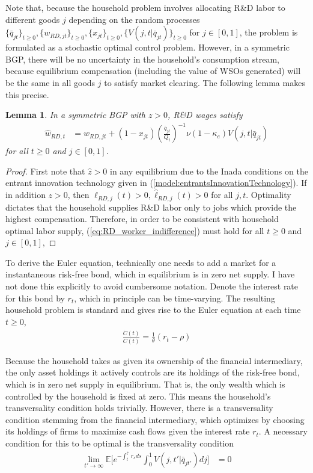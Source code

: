 \documentclass[11pt,english]{article}
\newtheorem{lemma}{Lemma}
\begin{document}
Note that, because the household problem involves allocating R\&D labor to different goods $j$ depending on the random processes $\{\bar{q}_{jt}\}_{t \ge 0}, \{w_{RD,jt}\}_{t\ge 0}, \{x_{jt}\}_{t\ge 0}, \{V(j,t|\bar{q}_{jt})\}_{t\ge 0}$ for $j \in [0,1]$, the problem is formulated as a stochastic optimal control problem. However, in a symmetric BGP, there will be no uncertainty in the household's consumption stream, because equilibrium compensation (including the value of WSOs generated) will be the same in all goods $j$ to satisfy market clearing. The following lemma makes this precise.

\begin{lemma}\label{lemma:RD_worker_indifference}
	In a symmetric BGP with $z > 0$, R\&D wages satisfy
	\begin{align}
	\hat{w}_{RD,t} &= w_{RD,jt} + (1-x_{jt}) (\frac{\bar{q}_{jt}}{Q_t})^{-1} \nu (1-\kappa_e) V(j,t|\bar{q}_{jt}) \label{eq:RD_worker_indifference}
	\end{align}
	for all $t \ge 0$ and $j \in [0,1]$.
\end{lemma}

\begin{proof}
	First note that $\hat{z} > 0$ in any equilibrium due to the Inada conditions on the entrant innovation technology given in  (\ref{model:entrantsInnovationTechnology}). If in addition $z > 0$, then $\ell_{RD,j}(t) > 0, \hat{\ell}_{RD,j}(t) > 0$ for all $j,t$. Optimality dictates that the household supplies R\&D labor only to jobs which provide the highest compensation. Therefore, in order to be consistent with household optimal labor supply, (\ref{eq:RD_worker_indifference}) must hold for all $t \ge 0$ and $j \in [0,1]$, 
\end{proof}

To derive the Euler equation, technically one needs to add a market for a instantaneous risk-free bond, which in equilibrium is in zero net supply. I have not done this explicitly to avoid cumbersome notation. Denote the interest rate for this bond by $r_t$, which in principle can be time-varying. The resulting household problem is standard and gives rise to the Euler equation at each time $t \ge 0$, 
\begin{align}
\frac{\dot{C}(t)}{C(t)} = \frac{1}{\theta} (r_t - \rho) \label{eq:euler0} 
\end{align}

Because the household takes as given its ownership of the financial intermediary, the only asset holdings it actively controls are its holdings of the risk-free bond, which is in zero net supply in equilibrium. That is, the only wealth which is controlled by the household is fixed at zero. This means the household's transversality condition holds trivially. However, there is a transversality condition stemming from the financial intermediary, which optimizes by choosing its holdings of firms to maximize cash flows given the interest rate $r_t$. A necessary condition for this to be optimal is the transversality condition
\begin{align}
	\lim_{t' \to \infty} \mathbb{E} \Big[ e^{-\int_t^{t'} r_s ds} \int_0^1 V(j,t'|\bar{q}_{jt'}) dj \Big] &= 0 \label{eq:tvc0}
\end{align}
\end{document}
